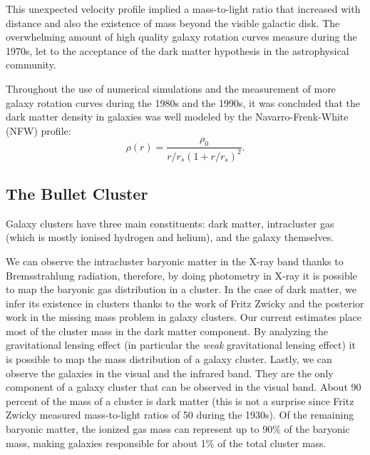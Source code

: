 This unexpected velocity profile implied a mass-to-light ratio that increased with distance and also the existence of mass beyond the visible galactic disk\cite{theIsMassOutside}.
The overwhelming amount of high quality galaxy rotation curves measure during the 1970s, let to the acceptance of the dark matter hypothesis in the astrophysical community.

Throughout the use of numerical simulations and the measurement of more galaxy rotation curves during the 1980s and the 1990s, it was concluded that the dark matter density in galaxies was well modeled by the Navarro-Frenk-White (NFW) profile\cite{FWN}\cite{mariangela}:
\begin{equation}
\rho(r) = \frac{\rho_0}{r/r_s(1+r/r_s)^2} \text{.}
\end{equation}
\subsection{The Bullet Cluster}
\label{bulletExplain}
Galaxy clusters have three main constituents: dark matter, intracluster gas (which is mostly ionised hydrogen and helium), and the galaxy themselves.\cite{book:75345}

We can observe the intracluster baryonic matter in the X-ray band thanks to Bremsstrahlung radiation, therefore, by doing photometry in X-ray it is possible to map the baryonic gas distribution in a cluster.
In the case of dark matter, we infer its existence in clusters thanks to the work of Fritz Zwicky and the posterior work in the missing mass problem in galaxy clusters.
Our current estimates place most of the cluster mass in the dark matter component.
By analyzing the gravitational lensing effect (in particular the \emph{weak} gravitational lensing effect) it is possible to map the mass distribution of a galaxy cluster. 
Lastly, we can observe the galaxies in the visual and the infrared band.
They are the only component of a galaxy cluster that can be observed in the visual band.
About 90 percent of the mass of a cluster is dark matter (this is not a surprise since Fritz Zwicky measured mass-to-light ratios of 50 during the 1930s). Of the remaining baryonic matter, the ionized gas mass can represent up to 90$\%$ of the baryonic mass, making galaxies responsible for about 1$\%$ of the total cluster mass.


